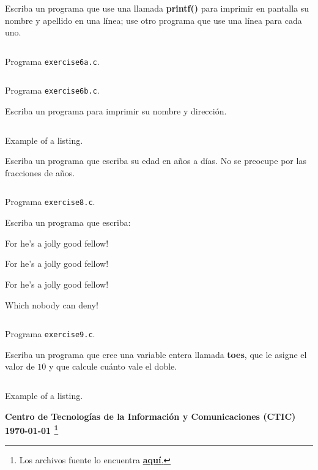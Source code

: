 \documentclass[spanish,addpoints,answers,a4paper]{exam}
\newcommand{\unmarkedfntext}[1]{%
	\begingroup
	\renewcommand\thefootnote{}\footnote{#1}%
	\addtocounter{footnote}{-1}%
	\endgroup
}
\begin{document}
\begin{questions}
\question Escriba un programa que use una llamada \textbf{printf()} para imprimir en pantalla su nombre y apellido en una línea; use otro programa que use una línea para cada uno.

\begin{solution}
\begin{listing}[H]
\footnotesize
\inputminted{c}{exercise6a.c}
\caption{Programa \texttt{exercise6a.c}.}
\label{lst:6a}
\end{listing}
\begin{listing}[H]
\footnotesize
\inputminted{c}{exercise6b.c}
\caption{Programa \texttt{exercise6b.c}.}
\label{lst:6b}
\end{listing}
\end{solution}

\question Escriba un programa para imprimir su nombre y dirección.

\begin{solution}
\begin{listing}[H]
\footnotesize
\inputminted{c}{exercise7.c}
\caption{Example of a listing.}
\label{lst:7}
\end{listing}
\end{solution}

\question Escriba un programa que escriba su edad en años a días. No se preocupe por las fracciones de años.

\begin{solution}%
\begin{listing}[H]
\footnotesize
\inputminted{c}{exercise8.c}
\caption{Programa \texttt{exercise8.c}.}
\label{lst:8}
\end{listing}
\end{solution}

\question Escriba un programa que escriba:

For he's a jolly good fellow!

For he's a jolly good fellow!

For he's a jolly good fellow!

Which nobody can deny!

\begin{solution}
\begin{listing}[H]
\footnotesize
\inputminted{c}{exercise9.c}
\caption{Programa \texttt{exercise9.c}.}
\label{lst:9}
\end{listing}
\end{solution}

\question Escriba un programa que cree una variable entera llamada \textbf{toes}, que le asigne el valor de $10$ y que calcule cuánto vale el doble.

\begin{solution}
\begin{listing}[H]
\footnotesize
\inputminted{c}{exercise10.c}
\caption{Example of a listing.}
\label{lst:10}
\end{listing}
\end{solution}

\end{questions}
\begin{flushright}\bfseries
Centro de Tecnologías de la Información y Comunicaciones (CTIC)\\[2mm]
\today\unmarkedfntext{Los archivos fuente lo encuentra  \href{https://github.com/carlosal1015/C-Programming}{\textbf{aquí}.}}
\end{flushright}
\end{document}
